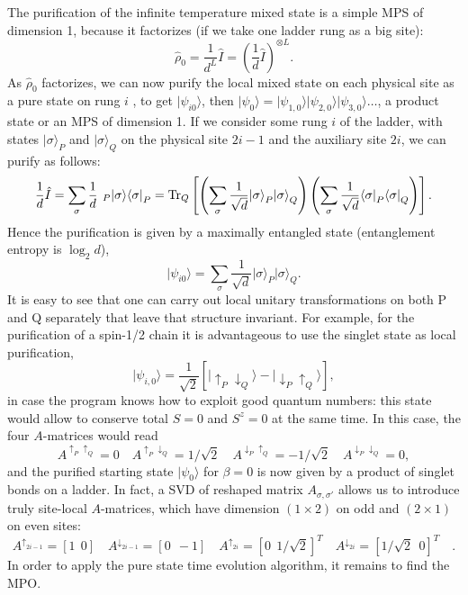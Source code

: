 \documentclass[a4paper,10pt,oneside,onecolumn,1p,times]{elsarticle}
\newcommand{\tr}{{\rm Tr }}
\newcommand{\bra}[1]{\mbox{$\langle #1  |$}}
\newcommand{\ket}[1]{\mbox{$| #1  \rangle$}}
\begin{document}
The purification of the infinite temperature mixed state is a simple MPS of dimension 1, because it factorizes (if we take one ladder rung as a big site):
\begin{equation}
\hat{\rho}_0 = \frac{1}{d^L} \hat{I} = \left(\frac{1}{d} \hat{I}\right)^{\otimes L} .
\end{equation}
As $\hat{\rho}_0$ factorizes, we can now purify the local mixed state on each physical site as a pure state on rung $i$ , to get $\ket{\psi_{i0}}$, then 
$\ket{\psi_0} = \ket{\psi_{1,0}}\ket{\psi_{2,0}}\ket{\psi_{3,0}} \ldots$, a product state or an MPS of dimension 1. If we consider some rung $i$ of the ladder, with states $\ket{\sigma}_P$ and $\ket{\sigma}_Q$ on the physical site $2i-1$ and the auxiliary site $2i$, we can purify as follows:
\begin{equation}
\frac{1}{d} \hat{I} = \sum_{\sigma} \frac{1}{d} \phantom\langle_P\ket{\sigma}\bra{\sigma}_P = \tr_Q \left[ \left( \sum_{\sigma} \frac{1}{\sqrt{d}} \ket{\sigma}_P \ket{\sigma}_Q \right) \left( \sum_{\sigma} \frac{1}{\sqrt{d}} \bra{\sigma}_P \bra{\sigma}_Q  \right) \right] .
\end{equation}
Hence the purification is given by a maximally entangled state (entanglement entropy is $\log_2 d$),
\begin{equation}
\ket{\psi_{i0}} = \sum_{\sigma} \frac{1}{\sqrt{d}} \ket{\sigma}_P \ket{\sigma}_Q .
\end{equation}
It is easy to see that one can carry out local unitary transformations on both P and Q separately that leave that structure invariant. For example, for the purification of a spin-1/2 chain it is  advantageous to use the singlet state as local purification,
\begin{equation}
\ket{\psi_{i,0}} = \frac{1}{\sqrt{2}} [ \ket{\uparrow_P\downarrow_Q} - \ket{\downarrow_P\uparrow_Q} ],
\end{equation}
in case the program knows how to exploit good quantum numbers: this state would allow to conserve total $S=0$ and $S^z=0$ at the same time. In this case, the four $A$-matrices would read
\begin{equation}
A^{\uparrow_P\uparrow_Q} =0 \quad 
A^{\uparrow_P\downarrow_Q} =1/\sqrt{2} \quad 
A^{\downarrow_P\uparrow_Q} =-1/\sqrt{2} \quad 
A^{\downarrow_P\downarrow_Q} =0  ,
\end{equation}
and the purified starting state $\ket{\psi_0}$ for $\beta=0$ is now given by a product of singlet bonds on a ladder. In fact, a SVD of reshaped matrix $A_{\sigma,\sigma'}$ allows us to introduce truly site-local $A$-matrices, which have dimension $(1\times 2)$ on odd and $(2\times 1)$ on even sites:
\begin{equation}
A^{\uparrow_{2i-1}} = [ 1\ \ 0] \quad
A^{\downarrow_{2i-1}} = [ 0\ \ -1] \quad
A^{\uparrow_{2i}} = [ 0\ \ 1/\sqrt{2}]^T \quad
A^{\downarrow_{2i}} = [ 1/\sqrt{2} \ \ 0]^T \quad .
\end{equation}
In order to apply the pure state time evolution algorithm, it remains to find the MPO.
 
\end{document}
